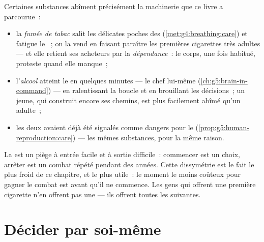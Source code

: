 \begin{proposition}\label{prop:g5:healthy-choices:substances}
Certaines substances abîment précisément la machinerie que ce livre
a parcourue~:
\begin{itemize}
  \item la \emph{fumée de tabac} salit les délicates poches des
         (\cref{met:g4:breathing:care}) et fatigue le
        ~; on la vend en faisant paraître les premières
        cigarettes très adultes --- et elle retient ses acheteurs
        par la \emph{dépendance}~: le corps, une
        fois habitué, proteste quand elle manque~;
  \item l'\emph{alcool} atteint le  en quelques minutes ---
        le chef lui-même (\cref{ch:g5:brain-in-command}) --- en
        ralentissant la boucle et en brouillant les décisions~; un
         jeune, qui construit encore ses chemins, est plus
        facilement abîmé qu'un  adulte~;
  \item les deux avaient déjà été signalés comme dangers pour le
         (\cref{prop:g5:human-reproduction:care}) --- les
        mêmes substances, pour la même raison.
\end{itemize}
\end{proposition}
\admitted

\begin{remark}\label{rem:g5:healthy-choices:never}
La  est un piège à entrée facile et à sortie difficile~:
commencer est un choix, arrêter est un combat répété pendant des
années. Cette dissymétrie est le fait le plus froid de ce chapitre,
et le plus utile~: le moment le moins coûteux pour gagner le combat
est avant qu'il ne commence. Les gens qui offrent une première
cigarette n'en offrent pas une --- ils offrent toutes les suivantes.
\end{remark}

\section{Décider par soi-même}

